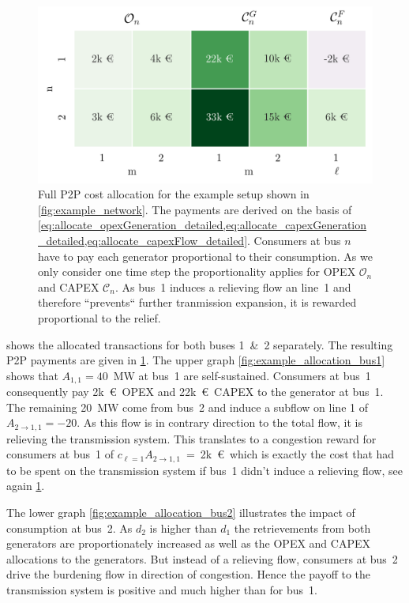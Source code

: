 \documentclass[11pt,twocolumn]{article}
\begin{document}
% 
% 
% 
\begin{figure}[h]
\centering
\includegraphics[width=\linewidth]{example_payoff.png}
\caption{Full P2P cost allocation for the example setup shown in \cref{fig:example_network}. The payments are derived on the basis of \cref{eq:allocate_opexGeneration_detailed,eq:allocate_capexGeneration_detailed,eq:allocate_capexFlow_detailed}. Consumers at bus $n$ have to pay each generator proportional to their consumption. As we only consider one time step the proportionality applies for OPEX $\mathcal{O}_n$ and CAPEX $\mathcal{C}_n$. As bus~1 induces a relieving flow an line~1 and therefore ``prevents`` further tranmission expansion, it is rewarded proportional to the relief.}
\label{fig:example_payoff}
\end{figure}
% 
% 
 shows the allocated transactions for both buses 1~\&~2 separately. The resulting P2P payments are given in \cref{fig:example_payoff}.
The upper graph \cref{fig:example_allocation_bus1} shows that $A_{1,1}=40$~MW at bus~1 are self-sustained. Consumers at bus~1 consequently pay 2k~\euro~OPEX and 22k~\euro~CAPEX to the generator at bus~1. The remaining 20~MW come from bus~2 and induce a subflow on line 1 of $A_{2 \rightarrow 1, 1} = -20$. As this flow is in contrary direction to the total flow, it is relieving the transmission system. This translates to a congestion reward for consumers at bus~1 of $c_{\ell=1} A_{2 \rightarrow 1, 1}$~=~2k~\euro\, which is exactly the cost that had to be spent on the transmission system if bus~1 didn't induce a relieving flow, see again \cref{fig:example_payoff}. 

The lower graph \cref{fig:example_allocation_bus2} illustrates the impact of consumption at bus~2. As $d_2$ is higher than $d_1$ the retrievements from both generators are proportionately increased as well as the OPEX and CAPEX allocations to the generators. But instead of a relieving flow, consumers at bus~2 drive the burdening flow in direction of congestion. Hence the payoff to the transmission system is positive and much higher than for bus~1.
\end{document}
